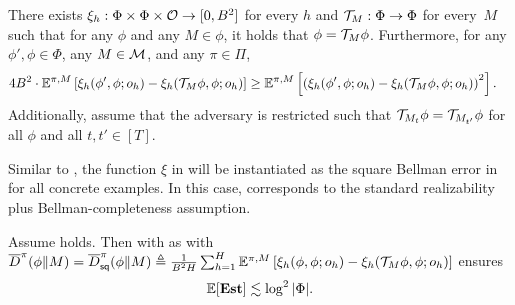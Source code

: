 \begin{assumption}\label{assum: squared est err}
   There exists $\xi_h: \Phi\times\Phi\times \mathcal{O} \to [0, B^2]$ for every $h$ and $\mathcal{T}_M: \Phi\to \Phi$ for every~$M$ such that for any $\phi$ and any $M\in\phi$, it holds that $\phi=\mathcal{T}_M\phi$. Furthermore, for any $\phi', \phi\in\Phi$, any $M\in\mathcal{M}$, and any $\pi\in\Pi$,  
   \begin{align*}
       4B^2\cdot \mathbb{E}^{\pi, M}\left[\xi_h(\phi', \phi; o_h) - \xi_h(\mathcal{T}_{M}\phi, \phi; o_h)\right] &\geq \mathbb{E}^{\pi, M}\left[\left(\xi_h(\phi', \phi; o_h) - \xi_h(\mathcal{T}_{M}\phi, \phi; o_h)\right)^2\right]. 
   \end{align*}
   Additionally, assume that the adversary is restricted such that $\mathcal{T}_{M_t}\phi = \mathcal{T}_{M_{t'}}\phi$ for all $\phi$ and all $t,t'\in[T]$. 
\end{assumption}
Similar to , the function $\xi$ in  will be instantiated as the square Bellman error in  for all concrete examples. In this case,  corresponds to the standard realizability plus Bellman-completeness assumption.


\begin{theorem}
\label{thm: sq est}
    Assume  holds. Then  with  as \postupdate with $\overline{D}^\pi(\phi\|M) = \overline{D}_{\mathsf{sq}}^\pi(\phi\|M) \triangleq \frac{1}{B^2H}\sum_{h=1}^H \mathbb{E}^{\pi, M}\left[\xi_h(\phi, \phi; o_h) - \xi_h(\mathcal{T}_{M}\phi, \phi; o_h)\right]$ ensures
    \begin{align*}
        \mathbb{E}[\textbf{\textup{Est}}] \lesssim \log^2|\Phi|. 
    \end{align*}
\end{theorem}


